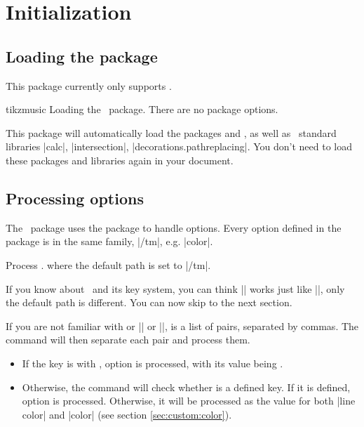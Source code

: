\section{Initialization}\label{sec:init}
\subsection{Loading the package}\label{sec:init:load}
This package currently only supports \LaTeXe.

\begin{package}{tikzmusic}
  Loading the \tmname\ package. There are no package options.
\end{package}

This package will automatically load the packages  
and \tikzname, as well as \tikzname\ standard libraries |calc|, 
|intersection|, |decorations.pathreplacing|. You don't need to load these 
packages and libraries again in your document.
\subsection{Processing options}\label{sec:init:options}
The \tmname\ package uses the  package to handle options. Every 
option defined in the package is in the same family, |/tm|, e.g. 
|color|.

\begin{command}{\tmset{}}
  Process . where the default path is set to |/tm|.
\end{command}

If you know about \tikzname\ and its key system, you can think |\tmset| 
works just like |\tikzset|, only the default path is different. You can now skip 
to the next section.

If you are not familiar with  or |\pgfkeys| or 
|\tikzset|,  is a list of  
pairs, separated by commas. The command will then separate each pair and process 
them.

\begin{itemize}
  \item If the key is with , option 
  is processed, with its value being .
  \item Otherwise, the command will check whether  is a defined key. 
  If it is defined, option  is processed. 
  Otherwise, it will be processed as the value for both |line color| and |color| 
  (see section \ref{sec:custom:color}).
\end{itemize}

